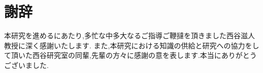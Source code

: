 \chapter{謝辞}\label{ux8b1dux8f9e}

本研究を進めるにあたり,多忙な中多大なるご指導ご鞭撻を頂きました西谷滋人教授に深く感謝いたします.
また,本研究における知識の供給と研究への協力をして頂いた西谷研究室の同輩,先輩の方々に感謝の意を表します.本当にありがとうございました.

    